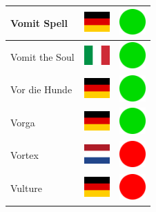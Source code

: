 \documentclass[12pt, a4paper, twoside]{report}
\begin{document}
\begin{center}
\begin{longtable}{|p{5cm}|p{2cm}|p{2cm}|}
 Vomit Spell                                                & \includegraphics[width=1cm]{../img/flags/de} &   \includegraphics[width=1cm]{../likes/y} \\ \hline
 Vomit the Soul                                             & \includegraphics[width=1cm]{../img/flags/it} &   \includegraphics[width=1cm]{../likes/y} \\ \hline
 Vor die Hunde                                              & \includegraphics[width=1cm]{../img/flags/de} &   \includegraphics[width=1cm]{../likes/y} \\ \hline
 Vorga                                                      & \includegraphics[width=1cm]{../img/flags/de} &   \includegraphics[width=1cm]{../likes/y} \\ \hline
 Vortex                                                     & \includegraphics[width=1cm]{../img/flags/nl} &   \includegraphics[width=1cm]{../likes/n} \\ \hline
 Vulture                                                    & \includegraphics[width=1cm]{../img/flags/de} &   \includegraphics[width=1cm]{../likes/n} \\ \hline

\end{longtable}
\end{center}
\end{document}
